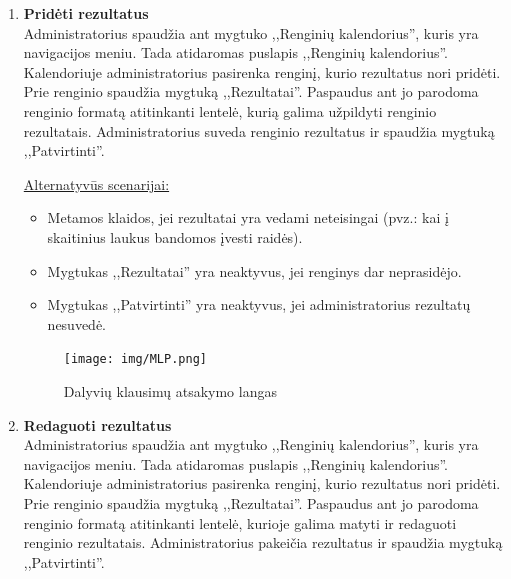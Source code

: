\documentclass{VUMIFPSkursinis}
\begin{document}
\begin{enumerate} [label = \textbf{U\arabic*.}]
					\underline{Alternatyvūs scenarijai:}
					\begin{itemize}
						\item Jei administratorius atsiradus dialogui atšaukia ištrinimą, dialogas pašalinamas ir parodomas renginio puslapis.
					\end{itemize}
				
				\begin{figure}[H]
					\centering
					\texttt{[image: img/MLP.png]}
					\caption{Dalyvių klausimų atsakymo langas}
					\label{fig:atsakyti-klausimus}
				\end{figure}
				
			\item \textbf{Pridėti rezultatus}   \\
					Administratorius spaudžia ant mygtuko ,,Renginių kalendorius'', kuris yra navigacijos meniu. Tada atidaromas puslapis ,,Renginių kalendorius''. Kalendoriuje administratorius pasirenka renginį, kurio rezultatus nori pridėti. Prie renginio spaudžia mygtuką ,,Rezultatai''. Paspaudus ant jo parodoma renginio formatą atitinkanti lentelė, kurią galima užpildyti renginio rezultatais. Administratorius suveda renginio rezultatus ir spaudžia mygtuką ,,Patvirtinti''.
					
					\underline{Alternatyvūs scenarijai:}
					\begin{itemize}
						\item Metamos klaidos, jei rezultatai yra vedami neteisingai (pvz.: kai į skaitinius laukus bandomos įvesti raidės).
						\item Mygtukas ,,Rezultatai'' yra neaktyvus, jei renginys dar neprasidėjo.
						\item Mygtukas ,,Patvirtinti'' yra neaktyvus, jei administratorius rezultatų nesuvedė.
					\end{itemize}
				
				\begin{figure}[H]
					\centering
					\texttt{[image: img/MLP.png]}
					\caption{Dalyvių klausimų atsakymo langas}
					\label{fig:atsakyti-klausimus}
				\end{figure}
					
			\item \textbf{Redaguoti rezultatus}   \\
					Administratorius spaudžia ant mygtuko ,,Renginių kalendorius'', kuris yra navigacijos meniu. Tada atidaromas puslapis ,,Renginių kalendorius''. Kalendoriuje administratorius pasirenka renginį, kurio rezultatus nori pridėti. Prie renginio spaudžia mygtuką ,,Rezultatai''. Paspaudus ant jo parodoma renginio formatą atitinkanti lentelė, kurioje galima matyti ir redaguoti renginio rezultatais. Administratorius pakeičia rezultatus ir spaudžia mygtuką ,,Patvirtinti''.
					

\end{enumerate}
\end{document}
